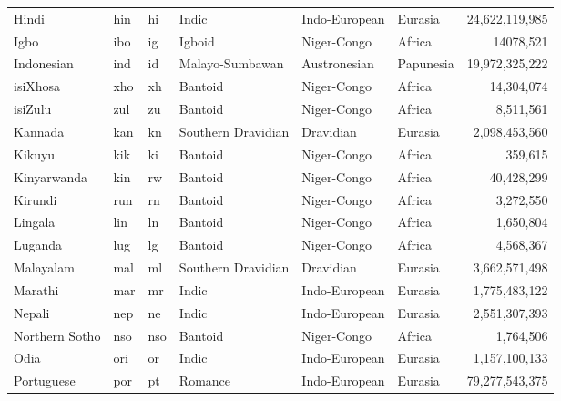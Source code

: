 \begin{table}[]
{\begin{tabular}{lTTlllr}
Hindi               & hin       & hi          & Indic                   & Indo-European  & Eurasia   & 24,622,119,985   \\
Igbo                & ibo       & ig          & Igboid                  & Niger-Congo    & Africa    & 14078,521      \\
Indonesian          & ind       & id          & Malayo-Sumbawan         & Austronesian   & Papunesia & 19,972,325,222   \\
isiXhosa               & xho       & xh          & Bantoid                 & Niger-Congo    & Africa    & 14,304,074      \\
isiZulu            & zul       & zu          & Bantoid                 & Niger-Congo    & Africa    & 8,511,561       \\
Kannada             & kan       & kn          & Southern Dravidian      & Dravidian      & Eurasia   & 2,098,453,560    \\
Kikuyu              & kik       & ki          & Bantoid                 & Niger-Congo    & Africa    & 359,615        \\
Kinyarwanda         & kin       & rw          & Bantoid                 & Niger-Congo    & Africa    & 40,428,299      \\
Kirundi             & run       & rn          & Bantoid                 & Niger-Congo    & Africa    & 3,272,550       \\
Lingala             & lin       & ln          & Bantoid                 & Niger-Congo    & Africa    & 1,650,804       \\
Luganda             & lug       & lg          & Bantoid                 & Niger-Congo    & Africa    & 4,568,367       \\
Malayalam           & mal       & ml          & Southern Dravidian      & Dravidian      & Eurasia   & 3,662,571,498    \\
Marathi             & mar       & mr          & Indic                   & Indo-European  & Eurasia   & 1,775,483,122    \\
Nepali              & nep       & ne          & Indic                   & Indo-European  & Eurasia   & 2,551,307,393    \\
Northern Sotho      & nso       & nso         & Bantoid                 & Niger-Congo    & Africa    & 1,764,506       \\
Odia                & ori       & or          & Indic                   & Indo-European  & Eurasia   & 1,157,100,133    \\
Portuguese          & por       & pt          & Romance                 & Indo-European  & Eurasia   & 79,277,543,375   \\

\end{tabular}}
\end{table}
